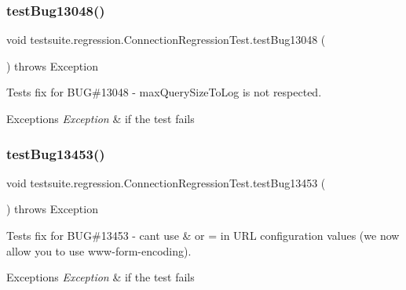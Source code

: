 \subsubsection{\texorpdfstring{test\+Bug13048()}{testBug13048()}}
{\footnotesize\ttfamily void testsuite.\+regression.\+Connection\+Regression\+Test.\+test\+Bug13048 (\begin{DoxyParamCaption}{ }\end{DoxyParamCaption}) throws Exception}

Tests fix for B\+UG\#13048 -\/ max\+Query\+Size\+To\+Log is not respected.


\begin{DoxyExceptions}{Exceptions}
{\em Exception} & if the test fails \\
\hline
\end{DoxyExceptions}
\mbox{\label{classtestsuite_1_1regression_1_1_connection_regression_test_af142c9614c193db02b2b9856d109b2ec}} 
\subsubsection{\texorpdfstring{test\+Bug13453()}{testBug13453()}}
{\footnotesize\ttfamily void testsuite.\+regression.\+Connection\+Regression\+Test.\+test\+Bug13453 (\begin{DoxyParamCaption}{ }\end{DoxyParamCaption}) throws Exception}

Tests fix for B\+UG\#13453 -\/ can\textquotesingle{}t use \& or = in U\+RL configuration values (we now allow you to use www-\/form-\/encoding).


\begin{DoxyExceptions}{Exceptions}
{\em Exception} & if the test fails \\
\hline
\end{DoxyExceptions}
\mbox{\label{classtestsuite_1_1regression_1_1_connection_regression_test_a35b61648054c98948b1f82e6b078c9b7}} 
